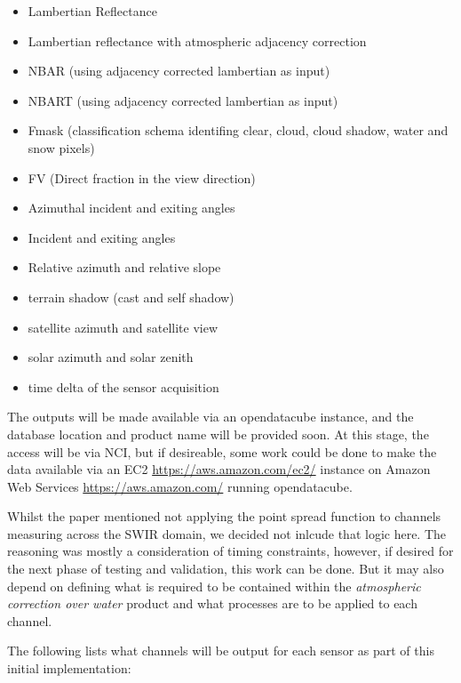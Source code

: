 \documentclass[a4paper]{article}
\begin{document}
      \begin{itemize}
        \item \small{Lambertian Reflectance}
        \item \small{Lambertian reflectance with atmospheric adjacency correction}
        \item \small{NBAR (using adjacency corrected lambertian as input)}
        \item \small{NBART (using adjacency corrected lambertian as input)}
        \item \small{Fmask (classification schema identifing clear, cloud, cloud shadow, water and snow pixels)}
        \item \small{FV (Direct fraction in the view direction)}
        \item \small{Azimuthal incident and exiting angles}
        \item \small{Incident and exiting angles}
        \item \small{Relative azimuth and relative slope}
        \item \small{terrain shadow (cast and self shadow)}
        \item \small{satellite azimuth and satellite view}
        \item \small{solar azimuth and solar zenith}
        \item \small{time delta of the sensor acquisition}
      \end{itemize}

    \begin{flushleft}
      The outputs will be made available via an opendatacube instance, and the database location and product name will be provided soon. At this stage, the access will be via NCI, but if desireable, some work could be done to make the data available via an EC2 \url{https://aws.amazon.com/ec2/} instance on Amazon Web Services \url{https://aws.amazon.com/} running opendatacube. \par
      Whilst the paper mentioned not applying the point spread function to channels measuring across the SWIR domain, we decided not inlcude that logic here. The reasoning was mostly a consideration of timing constraints, however, if desired for the next phase of testing and validation, this work can be done. But it may also depend on defining what is required to be contained within the \textit{atmospheric correction over water} product and what processes are to be applied to each channel. \par

    \clearpage

      The following lists what channels will be output for each sensor as part of this initial implementation:
    \end{flushleft}
\end{document}
